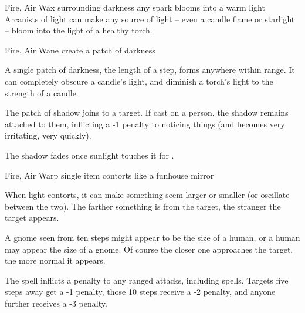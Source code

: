   {Fire, Air}%
  {Wax}%
  {}%
  {surrounding darkness}%
  {any spark blooms into a warm light}%
  {
    Arcanists of light can make any source of light -- even a candle flame or starlight -- bloom into the light of a healthy torch.
  }

  {Fire, Air}%
  {Wane}%
  {}%
  {}%
  {create a patch of darkness}%
  {
    A single patch of darkness, the length of a step, forms anywhere within range.
    It can completely obscure a candle's light, and diminish a torch's light to the strength of a candle.

    The patch of shadow joins to a target.
    If cast on a person, the shadow remains attached to them, inflicting a -1 penalty to noticing things (and becomes very irritating, very quickly).

    The shadow fades once sunlight touches it for .
  }

  {Fire, Air}%
  {Warp}%
  {}%
  {}%
  {single item contorts like a funhouse mirror}%
  {
    When light contorts, it can make something seem larger or smaller (or oscillate between the two).
    The farther something is from the target, the stranger the target appears.

    A gnome seen from ten steps might appear to be the size of a human, or a human may appear the size of a gnome.
    Of course the closer one approaches the target, the more normal it appears.

    The spell inflicts a penalty to any ranged attacks, including spells.
    Targets five steps away get a -1 penalty, those 10 steps receive a -2 penalty, and anyone further receives a -3 penalty.
  }


